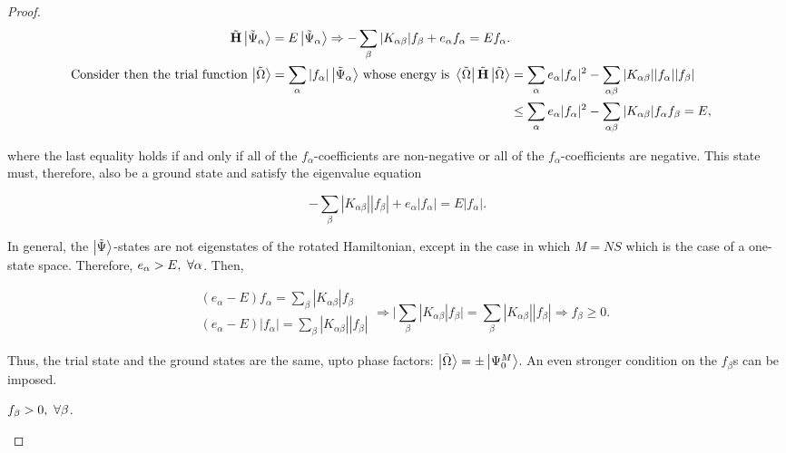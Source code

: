\documentclass{homework}
\begin{document}
\begin{proof}
\begin{equation*}\begin{split}
    \tilde{{\bf H}} \ket{\tilde{\Psi}_{\alpha}} = E \ket{\tilde{\Psi}_{\alpha}} \Rightarrow - \sum_{\beta} |K_{\alpha \beta}| f_{\beta} + e_{\alpha} f_{\alpha} = E f_{\alpha}. \\
    \textnormal{Consider then the trial function
          $\ket{\tilde{\Omega}} = \sum_{\alpha} |f_{\alpha}| \ket{\tilde{\Psi}_{\alpha}}$}      \textnormal{ whose energy is }
    \bra{\tilde{\Omega}} \tilde{{\bf H}} \ket{\tilde{\Omega}} &=  \sum_{\alpha} e_{\alpha} |f_{\alpha}|^2 - \sum_{\alpha \beta} |K_{\alpha \beta}| |f_{\alpha}| |f_{\beta}| \\
    & \leq \sum_{\alpha} e_{\alpha} |f_{\alpha}|^2 - \sum_{\alpha \beta} |K_{\alpha \beta}| f_{\alpha} f_{\beta} = E,
\end{split}
\end{equation*}

where the last equality holds if and only if all of the $f_{\alpha}$-coefficients are non-negative or all of the $f_{\alpha}$-coefficients are negative. This state must, therefore, also be a ground state and satisfy the eigenvalue equation 

$$
    - \sum_{\beta} |K_{\alpha \beta}| |f_{\beta}| + e_{\alpha} |f_{\alpha}| = E |f_{\alpha}|.
$$

In general, the $\ket{\tilde{\Psi}}$-states are not eigenstates of the rotated Hamiltonian, except in the case in which $M = NS$ which is the case of a one-state space. Therefore, $e_{\alpha} > E, \textnormal{ } \forall \alpha$. Then, 

\begin{equation}
    \begin{split}
    &(e_{\alpha} - E) f_{\alpha }= \sum_{\beta} |K_{\alpha \beta}| f_\beta \\
    &(e_{\alpha} - E) |f_{\alpha}|= \sum_{\beta} |K_{\alpha \beta}| |f_\beta|  
    \end{split} \Rightarrow \bigg|\sum_{\beta} |K_{\alpha \beta}| f_{\beta}\bigg| = \sum_{\beta} |K_{\alpha \beta}| |f_{\beta}| \Rightarrow f_{\beta} \geq 0.
\end{equation}

Thus, the trial state and the ground states are the same, upto phase factors: $\ket{\tilde{\Omega}} = \pm \ket{\Psi^M_0}$. An even stronger condition on the $f_{\beta}$s can be imposed.

\begin{lemma}
   $f_{\beta} > 0, \textnormal{ } \forall \beta$.
\end{lemma}


\end{proof}
\end{document}
